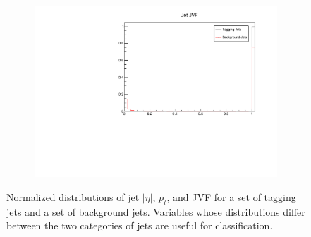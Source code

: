 \documentclass[10pt]{ucscthesisbs}
\begin{document}
\begin{figure}
\begin{subfigure}[b]{0.4\textwidth}
    \end{subfigure}
    \begin{subfigure}[b]{0.4\textwidth}
    	\includegraphics[width=\textwidth]{images/JetJVF}
    \end{subfigure}
    \caption{Normalized distributions of jet $|\eta|$, $p_t$, and JVF for a set of tagging jets and a set of background jets. Variables whose distributions differ between the two categories of jets are useful for classification.}
    \label{fig:jetvars}
\end{figure}
\end{document}
